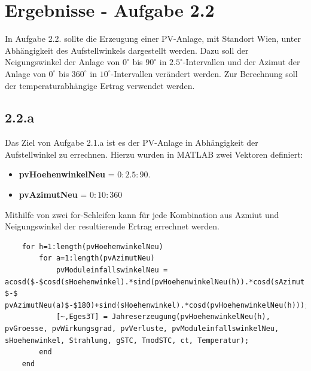 \documentclass[a4paper,12pt]{article}
\begin{document}
	\section{Ergebnisse - Aufgabe 2.2}
	In Aufgabe 2.2. sollte die Erzeugung einer PV-Anlage, mit Standort Wien, unter Abhängigkeit des Aufstellwinkels dargestellt werden. Dazu soll der Neigungswinkel der Anlage von $0^{\circ}$ bis $90^{\circ}$ in $2.5^{\circ}$-Intervallen und der Azimut der Anlage von $0^{\circ}$ bis $360^{\circ}$ in $10^{\circ}$-Intervallen verändert werden.\newline
	Zur Berechnung soll der temperaturabhängige Ertrag verwendet werden.
	\subsection{2.2.a}
	Das Ziel von Aufgabe 2.1.a ist es der PV-Anlage in Abhängigkeit der Aufstellwinkel zu errechnen.\newline
	Hierzu wurden in MATLAB zwei Vektoren definiert:
	\begin{itemize}
		\item \textbf{pvHoehenwinkelNeu} = $0:2.5:90$.
		\item \textbf{pvAzimutNeu} = $0:10:360$
	\end{itemize}
	Mithilfe von zwei for-Schleifen kann für jede Kombination aus Azmiut und Neigungswinkel der resultierende Ertrag errechnet werden.
	\begin{lstlisting}
	for h=1:length(pvHoehenwinkelNeu)
		for a=1:length(pvAzimutNeu)
			pvModuleinfallswinkelNeu = acosd($-$cosd(sHoehenwinkel).*sind(pvHoehenwinkelNeu(h)).*cosd(sAzimut $-$ pvAzimutNeu(a)$-$180)+sind(sHoehenwinkel).*cosd(pvHoehenwinkelNeu(h)));
			[~,Eges3T] = Jahreserzeugung(pvHoehenwinkelNeu(h), pvGroesse, pvWirkungsgrad, pvVerluste, pvModuleinfallswinkelNeu, sHoehenwinkel, Strahlung, gSTC, TmodSTC, ct, Temperatur);
		end
	end
	\end{lstlisting}
\end{document}
